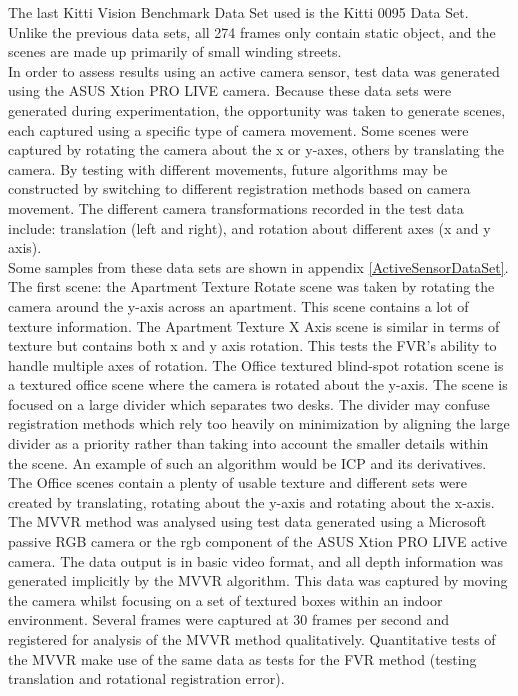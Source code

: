 The last Kitti Vision Benchmark Data Set used is the Kitti 0095 Data Set. Unlike the previous data sets, all 274 frames only contain static object, and the scenes are made up primarily of small winding streets. \\ 

In order to assess results using an active camera sensor, test data was generated using the ASUS Xtion PRO LIVE camera. Because these data sets were generated during experimentation, the opportunity was taken to generate scenes, each captured using a specific type of camera movement. Some scenes were captured by rotating the camera about the x or y-axes, others by translating the camera. By testing with different movements, future algorithms may be constructed by switching to different registration methods based on camera movement. The different camera transformations recorded in the test data include: translation (left and right), and rotation about different axes (x and y axis). \\

Some samples from these data sets are shown in appendix \ref{ActiveSensorDataSet}. The first scene: the Apartment Texture Rotate scene was taken by rotating the camera around the y-axis across an apartment. This scene contains a lot of texture information. The Apartment Texture X Axis scene is similar in terms of texture but contains both x and y axis rotation. This tests the FVR's ability to handle multiple axes of rotation. The Office textured blind-spot rotation scene is a textured office scene where the camera is rotated about the y-axis. The scene is focused on a large divider which separates two desks. The divider may confuse registration methods which rely too heavily on minimization by aligning the large divider as a priority rather than taking into account the smaller details within the scene. An example of such an algorithm would be ICP and its derivatives. The Office scenes contain a plenty of usable texture and different sets were created by translating, rotating about the y-axis and rotating about the x-axis. \\


The MVVR method was analysed using test data generated using a Microsoft passive RGB camera or the rgb component of the ASUS Xtion PRO LIVE active camera. The data output is in basic video format, and all depth information was generated implicitly by the MVVR algorithm. This data was captured by moving the camera whilst focusing on a set of textured boxes within an indoor environment. Several frames were captured at 30 frames per second and registered for analysis of the MVVR method qualitatively. Quantitative tests of the MVVR make use of the same data as tests for the FVR method (testing translation and rotational registration error). \\

